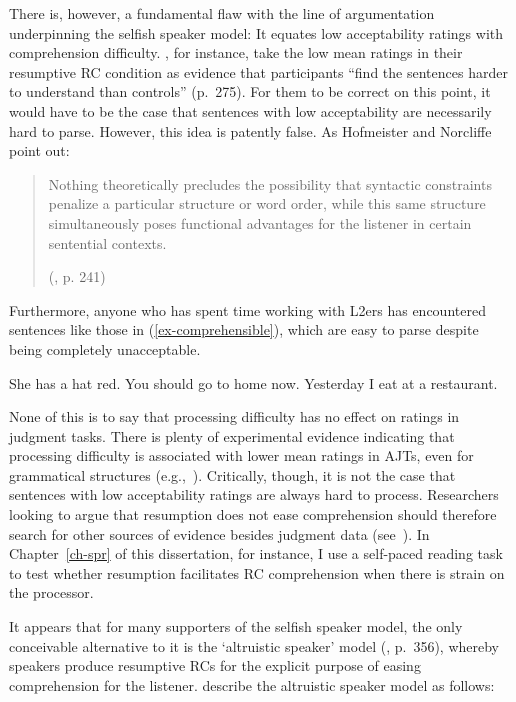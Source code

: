 There is, however, a fundamental flaw with the line of argumentation underpinning the selfish speaker model: It equates low acceptability ratings with comprehension difficulty. \textcite{ferreira.swets2005}, for instance, take the low mean ratings in their resumptive RC condition as evidence that participants ``find the sentences harder to understand than controls'' (p.~275). For them to be correct on this point, it would have to be the case that sentences with low acceptability are necessarily hard to parse. However, this idea is patently false. As Hofmeister and Norcliffe point out:

\begin{samepage}\begin{quote}
Nothing theoretically precludes the possibility that syntactic constraints penalize a particular structure or word order, while this same structure simultaneously poses functional advantages for the listener in certain sentential contexts.\par\nobreak\vspace{5pt}  
\hfill (\cite{hofmeister.norcliffe2013}, p. 241)
\end{quote}\end{samepage}\vspace{-6pt}

\noindent Furthermore, anyone who has spent time working with L2ers has encountered sentences like those in (\ref{ex-comprehensible}), which are easy to parse despite being completely unacceptable. 

\pex\label{ex-comprehensible}
\a \ljudge*She has a hat red.
\a \ljudge*You should go to home now.
\a \ljudge*Yesterday I eat at a restaurant.
\xe

None of this is to say that processing difficulty has no effect on ratings in judgment tasks. There is plenty of experimental evidence indicating that processing difficulty is associated with lower mean ratings in AJTs, even for grammatical structures (e.g.,~\cite{sprouse.etal2012}). Critically, though, it is not the case that sentences with low acceptability ratings are always hard to process. Researchers looking to argue that resumption does not ease comprehension should therefore search for other sources of evidence besides judgment data (see~\cite{morgan.etal2020}). In Chapter~\ref{ch-spr} of this dissertation, for instance, I use a self-paced reading task to test whether resumption facilitates RC comprehension when there is strain on the processor.

It appears that for many supporters of the selfish speaker model, the only conceivable alternative to it is the `altruistic speaker' model (\cite{polinsky.etal2013}, p.~356), whereby speakers produce resumptive RCs for the explicit purpose of easing comprehension for the listener. \textcite{morgan.ferreira2022} describe the altruistic speaker model as follows:

